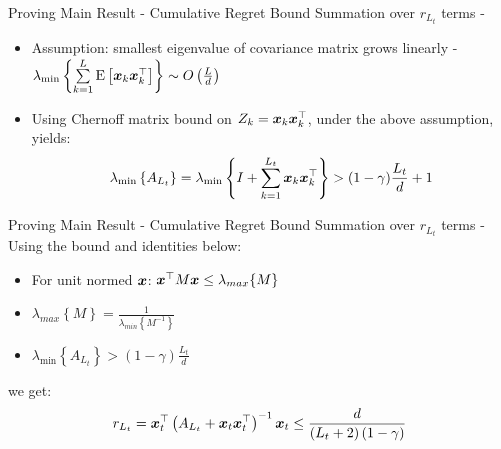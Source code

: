 \documentclass{beamer}
\begin{document}
\begin{frame}{Proving Main Result - Cumulative Regret Bound}
Summation over $r_{L_t}$ terms - \newline
\begin{itemize}
\item Assumption: smallest eigenvalue of covariance matrix grows linearly - $\lambda_{\min}\left\{\sum\limits_{k=1}^{L}{\rm E}\left[{{\boldsymbol{x}}_{k}{{\boldsymbol{x}}}^{\top}_{k}}\right]\right\}\sim O\left(\frac{L}{d}\right)$\newline 
\item Using Chernoff matrix bound on $Z_k={\boldsymbol{x}}_{k}{{\boldsymbol{x}}}^{\top}_{k}$, under the above assumption, yields:
\begin{equation}
\lambda_{\min}\left\{A_{L_t}\right\}=\lambda_{\min}\left\{I+\sum\limits_{k=1}^{L_t} {\boldsymbol{x}}_{k}{{\boldsymbol{x}}}^{\top}_{k}\right\}>(1-\gamma)\frac{L_t}{d}+1
\label{lamda_min_bound}
\end{equation}
\end{itemize}
\end{frame}


\begin{frame}{Proving Main Result - Cumulative Regret Bound}
Summation over $r_{L_t}$ terms - \newline\newline
Using the bound and identities below:\newline
\begin{itemize}
\item For unit normed ${\boldsymbol{x}}$: ${{\boldsymbol{x}}}^{\top} M{\boldsymbol{x}}\leq \lambda_{max}\{M\}$
\item $\lambda_{max}\left\{M\right\}=\frac{1}{\lambda_{min}\left\{M^{-1}\right\}}$
\item $\lambda_{\min}\left\{A_{L_t}\right\}>\left(1-\gamma\right)\frac{L_t}{d}$\newline
\end{itemize}
we get:
\begin{eqnarray}
r_{L_t}={{\boldsymbol{x}}}^{\top}_{t}\left(A_{L_t}+{\boldsymbol{x}}_{t}{{\boldsymbol{x}}}^{\top}_{t}\right)^{-1}{\boldsymbol{x}}_{t}\leq\frac{d}{\left(L_t+2\right)\left(1-\gamma\right)}
\end{eqnarray}
\end{frame}
\end{document}
